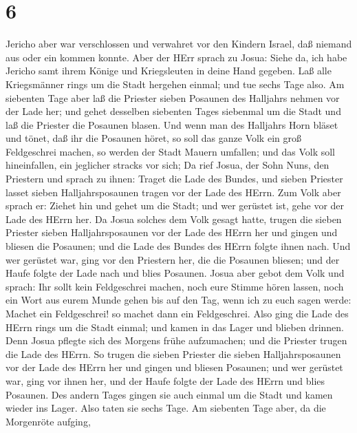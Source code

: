 \hypertarget{section-5}{%
\section{6}\label{section-5}}

 Jericho aber war verschlossen und verwahret vor den Kindern
Israel, daß niemand aus oder ein kommen konnte.  Aber der
HErr sprach zu Josua: Siehe da, ich habe Jericho samt ihrem Könige und
Kriegsleuten in deine Hand gegeben.  Laß alle Kriegsmänner
rings um die Stadt hergehen einmal; und tue sechs Tage also.
 Am siebenten Tage aber laß die Priester sieben Posaunen des
Halljahrs nehmen vor der Lade her; und gehet desselben siebenten Tages
siebenmal um die Stadt und laß die Priester die Posaunen blasen.
 Und wenn man des Halljahrs Horn bläset und tönet, daß ihr
die Posaunen höret, so soll das ganze Volk ein groß Feldgeschrei machen,
so werden der Stadt Mauern umfallen; und das Volk soll hineinfallen, ein
jeglicher stracks vor sich;  Da rief Josua, der Sohn Nuns,
den Priestern und sprach zu ihnen: Traget die Lade des Bundes, und
sieben Priester lasset sieben Halljahrsposaunen tragen vor der Lade des
HErrn.  Zum Volk aber sprach er: Ziehet hin und gehet um die
Stadt; und wer gerüstet ist, gehe vor der Lade des HErrn her.
 Da Josua solches dem Volk gesagt hatte, trugen die sieben
Priester sieben Halljahrsposaunen vor der Lade des HErrn her und gingen
und bliesen die Posaunen; und die Lade des Bundes des HErrn folgte ihnen
nach.  Und wer gerüstet war, ging vor den Priestern her, die
die Posaunen bliesen; und der Haufe folgte der Lade nach und blies
Posaunen.  Josua aber gebot dem Volk und sprach: Ihr sollt
kein Feldgeschrei machen, noch eure Stimme hören lassen, noch ein Wort
aus eurem Munde gehen bis auf den Tag, wenn ich zu euch sagen werde:
Machet ein Feldgeschrei! so machet dann ein Feldgeschrei. 
Also ging die Lade des HErrn rings um die Stadt einmal; und kamen in das
Lager und blieben drinnen.  Denn Josua pflegte sich des
Morgens frühe aufzumachen; und die Priester trugen die Lade des HErrn.
 So trugen die sieben Priester die sieben Halljahrsposaunen
vor der Lade des HErrn her und gingen und bliesen Posaunen; und wer
gerüstet war, ging vor ihnen her, und der Haufe folgte der Lade des
HErrn und blies Posaunen.  Des andern Tages gingen sie auch
einmal um die Stadt und kamen wieder ins Lager. Also taten sie sechs
Tage.  Am siebenten Tage aber, da die Morgenröte aufging,
